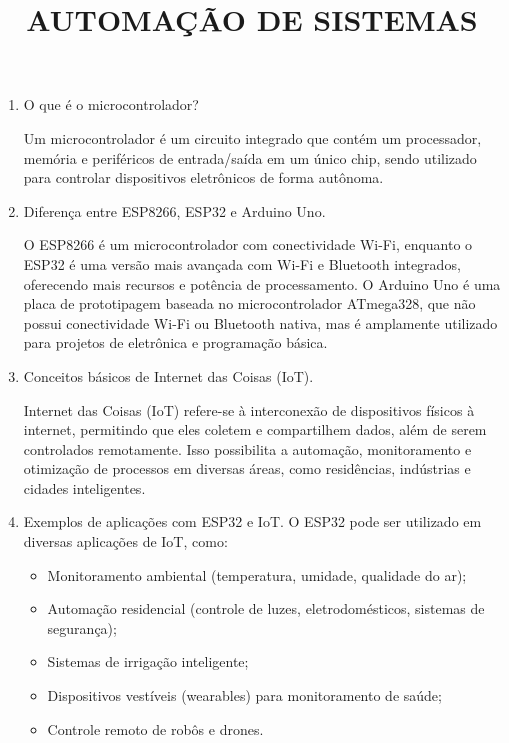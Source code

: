 \documentclass[a4paper]{article}
\title{AUTOMAÇÃO DE SISTEMAS}
\begin{document}
    \header{}
    
    \begin{answer}
    \begin{enumerate}
        \item O que é o microcontrolador?
         
            Um microcontrolador é um circuito integrado que contém um processador, 
            memória e periféricos de entrada/saída em um único chip, sendo utilizado
            para controlar dispositivos eletrônicos de forma autônoma.

        \item Diferença entre ESP8266, ESP32 e Arduino Uno.
        
            O ESP8266 é um microcontrolador com conectividade Wi-Fi, enquanto o ESP32
            é uma versão mais avançada com Wi-Fi e Bluetooth integrados, oferecendo
            mais recursos e potência de processamento. O Arduino Uno é uma placa
            de prototipagem baseada no microcontrolador ATmega328, que não possui
            conectividade Wi-Fi ou Bluetooth nativa, mas é amplamente utilizado
            para projetos de eletrônica e programação básica.

        \item Conceitos básicos de Internet das Coisas (IoT).
        
            Internet das Coisas (IoT) refere-se à interconexão de dispositivos físicos
            à internet, permitindo que eles coletem e compartilhem dados, além de
            serem controlados remotamente. Isso possibilita a automação, monitoramento
            e otimização de processos em diversas áreas, como residências, indústrias
            e cidades inteligentes.
        
        \item Exemplos de aplicações com ESP32 e IoT.
            O ESP32 pode ser utilizado em diversas aplicações de IoT, como:

            \begin{itemize}
                \item Monitoramento ambiental (temperatura, umidade, qualidade do ar);
                \item Automação residencial (controle de luzes, eletrodomésticos, sistemas de segurança);
                \item Sistemas de irrigação inteligente;
                \item Dispositivos vestíveis (wearables) para monitoramento de saúde;
                \item Controle remoto de robôs e drones.
            \end{itemize}
    \end{enumerate}
    \end{answer}
    
\end{document}
